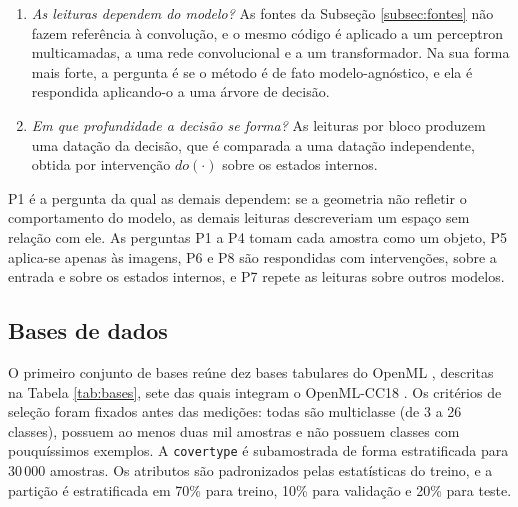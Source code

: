 \begin{enumerate}
    \item[\textbf{P7.}] \textit{As leituras dependem do modelo?} As fontes da Subseção \ref{subsec:fontes} não fazem referência à convolução, e o mesmo código é aplicado a um perceptron multicamadas, a uma rede convolucional e a um transformador. Na sua forma mais forte, a pergunta é se o método é de fato modelo-agnóstico, e ela é respondida aplicando-o a uma árvore de decisão.

    \item[\textbf{P8.}] \textit{Em que profundidade a decisão se forma?} As leituras por bloco produzem uma datação da decisão, que é comparada a uma datação independente, obtida por intervenção $do(\cdot)$ sobre os estados internos.
\end{enumerate}

P1 é a pergunta da qual as demais dependem: se a geometria não refletir o comportamento do modelo, as demais leituras descreveriam um espaço sem relação com ele. As perguntas P1 a P4 tomam cada amostra como um objeto, P5 aplica-se apenas às imagens, P6 e P8 são respondidas com intervenções, sobre a entrada e sobre os estados internos, e P7 repete as leituras sobre outros modelos.

\subsection{Bases de dados}\label{subsec:dados}

O primeiro conjunto de bases reúne dez bases tabulares do OpenML \citep{Vanschoren2014}, descritas na Tabela \ref{tab:bases}, sete das quais integram o OpenML-CC18 \citep{Bischl2021}. Os critérios de seleção foram fixados antes das medições: todas são multiclasse (de 3 a 26 classes), possuem ao menos duas mil amostras e não possuem classes com pouquíssimos exemplos. A \texttt{covertype} é subamostrada de forma estratificada para 30\,000 amostras. Os atributos são padronizados pelas estatísticas do treino, e a partição é estratificada em 70\% para treino, 10\% para validação e 20\% para teste.

